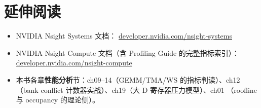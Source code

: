 \section*{延伸阅读}
\begin{itemize}
\item NVIDIA Nsight Systems 文档：
  \href{https://developer.nvidia.com/nsight-systems}{developer.nvidia.com/nsight-systems}
\item NVIDIA Nsight Compute 文档（含 Profiling Guide 的完整指标索引）：
  \href{https://developer.nvidia.com/nsight-compute}{developer.nvidia.com/nsight-compute}
\item 本书各章\textbf{性能分析}节：ch09--14（GEMM/TMA/WS 的指标判读）、ch12
  （bank conflict 计数器实战）、ch19（大 D 寄存器压力模型）、ch01
  （roofline 与 occupancy 的理论侧）。
\end{itemize}
